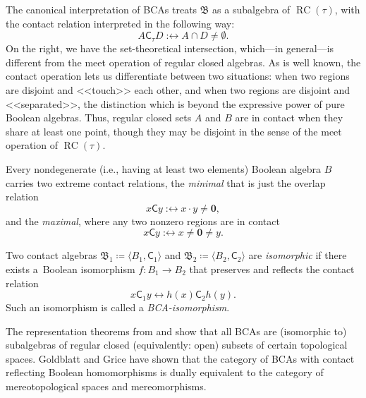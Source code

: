 \documentclass[a4paper,12pt]{amsart}
\numberwithin{equation}{section}
\theoremstyle{mytheoremstyle}
\newcommand\iffdef{\;\mathrel{\mathord{:}\mathord{\longleftrightarrow}}\;}
\DeclareMathOperator{\RCvtex}{RC}
\begin{document}
The canonical interpretation of BCAs treats $\mathfrak{B}$ as a subalgebra of
$\RCvtex (\tau )$, with the contact relation interpreted in the following way:
%
\begin{equation*}
A\mathrel{\mathsf{C}}_{\tau} D\iffdef A\cap D\neq \emptyset .
\end{equation*}
%
On the right, we have the set-theoretical intersection, which---in general---is
different from the meet operation of regular closed algebras. As is well known,
the contact operation lets us differentiate between two situations: when
two regions are disjoint and <<touch>> each other, and when two regions
are disjoint and <<separated>>, the distinction which is beyond the expressive
power of pure Boolean algebras. Thus, regular closed sets $A$ and
$B$ are in contact when they share at least one point, though they may
be disjoint in the sense of the meet operation of $\RCvtex (\tau )$.

Every nondegenerate (i.e., having at least two elements) Boolean algebra
$B$ carries two extreme contact relations, the \emph{minimal} that is just
the overlap relation
%
\begin{equation*}
x\mathrel{\mathsf{C}}y\iffdef x\cdot y\neq \mathbf{0},
\end{equation*}
%
and the \emph{maximal}, where any two nonzero regions are in contact
%
\begin{equation*}
x\mathrel{\mathsf{C}}y\iffdef x\neq \mathbf{0}\neq y.
\end{equation*}

Two contact algebras
$\mathfrak{B}_{1}\coloneqq   \langle B_{1},\mathrel{\mathsf{C}}_{1}
  \rangle $ and
$\mathfrak{B}_{2}\coloneqq   \langle B_{2},\mathrel{\mathsf{C}}_{2}
  \rangle $ are \emph{isomorphic} if there exists a~Boolean isomorphism
$f\colon B_{1}\to B_{2}$ that preserves and reflects the contact relation
%
\begin{equation*}
x\mathrel{\mathsf{C}}_{1} y\longleftrightarrow h(x)\mathrel{
\mathsf{C}}_{2} h(y).
\end{equation*}
%
Such an isomorphism is called a \emph{BCA-isomorphism}.

The representation theorems from \cite{Duntsch-et-al-RTBCA} and
\cite{Dimov-et-al-CARBTSPA1} show that all BCAs are (isomorphic to) subalgebras
of regular closed (equivalently: open) subsets of certain topological spaces.
Goldblatt and Grice \cite{Goldblatt-et-al-MADFMS} have shown that
the category of BCAs with contact reflecting Boolean homomorphisms is dually equivalent
to the category of mereotopological spaces and mereomorphisms.
\end{document}
